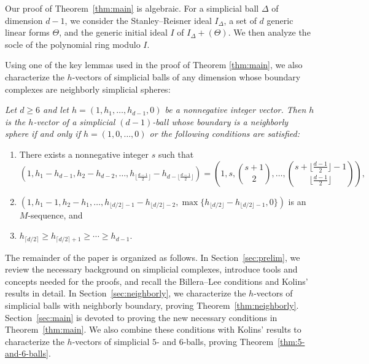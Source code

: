 \documentclass[11pt]{article}
\newenvironment{numtheorem}[1]{\medskip\noindent {\bf Theorem~#1.}\em}{}
\theoremstyle{definition}
\numberwithin{equation}{theorem}
\begin{document}
Our proof of Theorem~\ref{thm:main} is algebraic. For a simplicial ball $\Delta$ of dimension $d-1$, we consider the Stanley--Reisner ideal $I_\Delta$, a set of $d$ generic linear forms $\Theta$, and the generic initial ideal $I$ of $I_\Delta+(\Theta)$. We then analyze the socle of the polynomial ring modulo $I$.



Using one of the key lemmas used in the proof of Theorem \ref{thm:main},
we also characterize the $h$-vectors of simplicial balls of any dimension whose boundary complexes are neighborly simplicial spheres:



\begin{numtheorem}{\ref{thm:neighborly}}
Let $d\geq 6$ and let $h=(1,h_1, \ldots, h_{d-1}, 0)$ be a nonnegative integer vector. Then $h$ is the $h$-vector of a simplicial $(d-1)$-ball whose boundary is a neighborly sphere if and only if $h = (1,0,\ldots, 0)$ or the following conditions are satisfied:
\begin{enumerate}
\item There exists a nonnegative integer $s$ such that
\[
(1, h_1-h_{d-1}, h_2-h_{d-2}, \ldots, h_{\lfloor\frac{d-1}{2}\rfloor}-h_{d-\lfloor\frac{d-1}{2}\rfloor}) = \left(1, s, \binom{s+1}{2}, \ldots, \binom{s+\lfloor\frac{d-1}{2}\rfloor-1}{\lfloor\frac{d-1}{2}\rfloor}\right), 
\]
\item $(1, h_1-1, h_2-h_1, \ldots, h_{\lfloor d/2 \rfloor-1} - h_{\lfloor d/2 \rfloor-2}, \max\{h_{\lfloor d/2 \rfloor} - h_{\lfloor d/2 \rfloor-1},0\})$ is an $M$-sequence, and
\item $h_{\lceil d/2 \rceil} \geq h_{\lceil d/2 \rceil +1} \geq \cdots \geq h_{d-1}$.
\end{enumerate}
\end{numtheorem}




The remainder of the paper is organized as follows. In Section~\ref{sec:prelim}, we review the necessary background on simplicial complexes, introduce tools and concepts needed for the proofs, and recall the Billera--Lee conditions and Kolins' results in detail. In Section~\ref{sec:neighborly}, we characterize the $h$-vectors of simplicial balls with neighborly boundary, proving Theorem~\ref{thm:neighborly}. Section~\ref{sec:main} is devoted to proving the new necessary conditions in Theorem~\ref{thm:main}. We also combine these conditions with Kolins' results to characterize the $h$-vectors of simplicial $5$- and $6$-balls, proving Theorem~\ref{thm:5-and-6-balls}.
\end{document}
